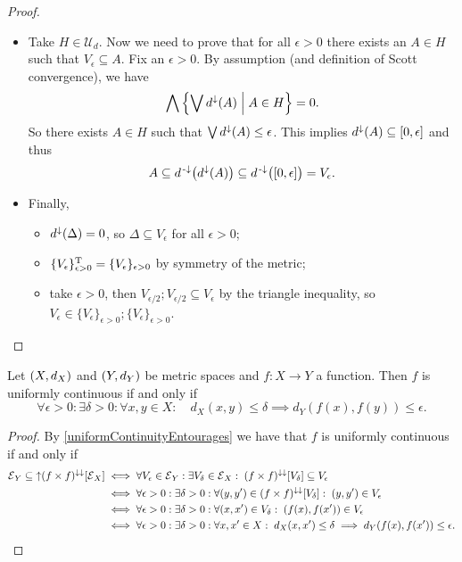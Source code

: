 \begin{proof}
\begin{itemize}
\item Take $H\in \mathcal{U}_d$. 
Now we need to prove that for all $\epsilon >0$ there exists an $A\in H$ such that $V_\epsilon \subseteq A$. Fix an $\epsilon > 0$. By assumption (and definition of Scott convergence), we have
\[ \bigwedge \left\{ \bigvee d^\downarrow(A) \;\middle|\; A\in H \right\} = 0. \]
So there exists $A\in H$ such that $\bigvee d^\downarrow(A) \leq \epsilon$. This implies $d^\imf(A) \subseteq \interval{0,\epsilon}$ and thus
\[ A \subseteq d^\preimf\big(d^{\imf}(A)\big) \subseteq d^\preimf\big(\interval{0,\epsilon}\big) = V_\epsilon. \]
\item Finally,
\begin{itemize}
\item $d^{\downarrow}(\Delta) = 0$, so $\Delta \subseteq V_\epsilon$ for all $\epsilon > 0$;
\item $\{V_\epsilon\}_{\epsilon>0}^{\mathrm{T}} = \{V_\epsilon\}_{\epsilon>0}$ by symmetry of the metric;
\item take $\epsilon>0$, then $V_{\epsilon/2};V_{\epsilon/2} \subseteq V_\epsilon$ by the triangle inequality, so $V_\epsilon \in \{V_\epsilon\}_{\epsilon>0}; \{V_\epsilon\}_{\epsilon>0}$.
\end{itemize}
\end{itemize}
\end{proof}
\begin{corollary}
Let $\left( X, d_X \right)$ and $\left( Y, d_Y \right)$ be metric spaces and $f:X\to Y$ a function. Then $f$ is uniformly continuous \textup{if and only if}
\[ \forall \epsilon >0: \exists \delta >0: \forall x,y\in X: \quad d_X(x,y) \leq \delta \implies d_Y(f(x), f(y)) \leq \epsilon. \]
\end{corollary}
\begin{proof}
By \ref{uniformContinuityEntourages} we have that $f$ is uniformly continuous \textup{if and only if}
\begin{align*}
\operatorname{\mathcal{E}}_Y \subseteq \operatorname{\uparrow}(f\times f)^{\downarrow\downarrow}[\operatorname{\mathcal{E}}_X] &\iff \forall V_\epsilon \in \operatorname{\mathcal{E}}_Y: \exists V_\delta \in \operatorname{\mathcal{E}}_X: \; (f\times f)^{\downarrow\downarrow}[V_\delta] \subseteq V_\epsilon \\
&\iff \forall \epsilon>0: \exists \delta>0: \forall (y,y')\in (f\times f)^{\downarrow\downarrow}[V_\delta]: \; (y,y')\in V_\epsilon \\
&\iff \forall \epsilon>0: \exists \delta>0: \forall (x,x')\in V_\delta:\; (f(x),f(x'))\in V_\epsilon \\
&\iff \forall \epsilon>0: \exists \delta>0: \forall x,x'\in X: \; d_X(x,x')\leq \delta \implies d_Y(f(x),f(x'))\leq \epsilon.
\end{align*}
\end{proof}

